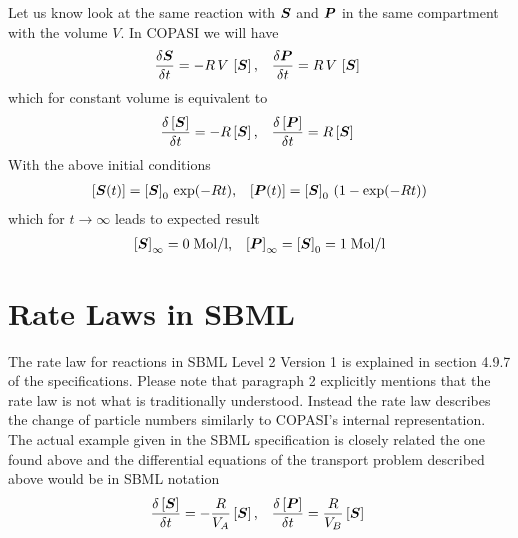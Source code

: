 \documentclass[12pt,english]{article}
\newcommand{\boldsymbol}[1]{\mbox{\boldmath $#1$}}
\begin{document}
Let us know look at the same reaction with $\boldsymbol{S}$ and
$\boldsymbol{P}$ in the same compartment with the volume
$V$. In COPASI we will have
%
\begin{eqnarray}
\frac{\delta \boldsymbol{S}}{\delta t} 
= - R\, V\, \left[\boldsymbol{S}\right]
\mbox{,} &&
\frac{\delta \boldsymbol{P}}{\delta t} 
=   R\, V\, \left[\boldsymbol{S}\right] \
\end{eqnarray} 
%
which for constant volume is equivalent to
%
\hypertarget{COPASI_2}{
\begin{eqnarray}\label{COPASI_2}
\frac{\delta \left[\boldsymbol{S}\right]}{\delta t} 
= - R \left[\boldsymbol{S}\right]
\mbox{,} &&
\frac{\delta \left[\boldsymbol{P}\right]}{\delta t} 
=   R \left[\boldsymbol{S}\right] \
\end{eqnarray} 
}
%
With the above initial conditions
%
\begin{eqnarray}
\left[\boldsymbol{S}(t)\right] = \left[\boldsymbol{S}\right]_0 \, \exp(-Rt) 
\mbox{,} &&
\left[\boldsymbol{P}(t)\right] = \left[\boldsymbol{S}\right]_0 
\, (1 - \exp(-Rt))
\end{eqnarray} 
%
which for $t \rightarrow \infty$ leads to expected result
%
\begin{eqnarray}
\left[\boldsymbol{S}\right]_\infty = 0\; \mbox{Mol/l}
\mbox{,} &&
\left[\boldsymbol{P}\right]_\infty
 = \left[\boldsymbol{S}\right]_0
 = 1\; \mbox{Mol/l} 
\end{eqnarray} 
%

\section{Rate Laws in SBML}
The rate law for reactions in SBML Level 2 Version 1 is explained in
section 4.9.7 of the specifications. Please note that paragraph 2
explicitly mentions that the rate law is not what is traditionally
understood. Instead the rate law describes the change of particle
numbers similarly to COPASI's internal representation. The actual
example given in the SBML specification is closely related the one
found above and the differential equations of the transport problem
described above would be in SBML notation
%
\hypertarget{SBML}{
\begin{eqnarray}\label{SBML}
\frac{\delta \left[\boldsymbol{S}\right]}{\delta t} 
= - \frac{R}{V_A} \left[\boldsymbol{S}\right]
\mbox{,} &&
\frac{\delta \left[\boldsymbol{P}\right]}{\delta t} 
=   \frac{R}{V_B} \left[\boldsymbol{S}\right] \
\end{eqnarray} 
}
%
\end{document}
